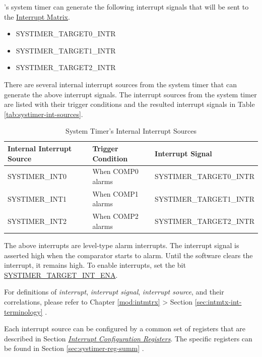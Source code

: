 \documentclass[main\_\_EN.tex]{subfiles}
\begin{document}
\chipname{}'s system timer can generate the following interrupt signals that will be sent to the \hyperref[mod:intmtrx]{Interrupt Matrix}.

    \begin{itemize}
        \item SYSTIMER\_TARGET0\_INTR
        \item SYSTIMER\_TARGET1\_INTR
        \item SYSTIMER\_TARGET2\_INTR
    \end{itemize}

There are several internal interrupt sources from the system timer that can generate the above interrupt signals. The interrupt sources from the system timer are listed with their trigger conditions and the resulted interrupt signals in Table \ref{tab:systimer-int-sources}.

\begin{longtable}{ | L{3cm} | L{5cm} | L{7.5cm} | }
\caption{System Timer's Internal Interrupt Sources} \label{tab:systimer-int-sources}
\\ \hline
{}
\textbf{Internal Interrupt Source} & \textbf{Trigger Condition}  &  \textbf{Interrupt Signal}\\ \hline
\label{int:SYSTIMERINT0}SYSTIMER\_INT0  &  When COMP0 alarms & SYSTIMER\_TARGET0\_INTR  \\ \hline
\label{int:SYSTIMERINT1}SYSTIMER\_INT1 &  When COMP1 alarms & SYSTIMER\_TARGET1\_INTR \\ \hline
\label{int:SYSTIMERINT2}SYSTIMER\_INT2 &
When COMP2 alarms & SYSTIMER\_TARGET2\_INTR  \\ \hline
\end{longtable}

The above interrupts are level-type alarm interrupts. The interrupt signal is asserted high when the comparator starts to alarm. Until the software clears the interrupt, it remains high. To enable interrupts, set the bit \hyperref[fielddesc:SYSTIMERTARGET0INTENA]{SYSTIMER\_TARGET\_INT\_ENA}.

\begin{tiplisting}
For definitions of \textit{interrupt}, \textit{interrupt signal}, \textit{interrupt source}, and their correlations, please refer to Chapter \ref{mod:intmtrx} \textit{} > Section \ref{sec:intmtx-int-terminology} \textit{}.
\end{tiplisting}

Each interrupt source can be configured by a common set of registers that are described in Section \hyperref[interrupt-config-registers]{\textit{Interrupt Configuration Registers}}. The specific registers can be found in Section \ref{sec:systimer-reg-summ} \textit{}.
\end{document}
